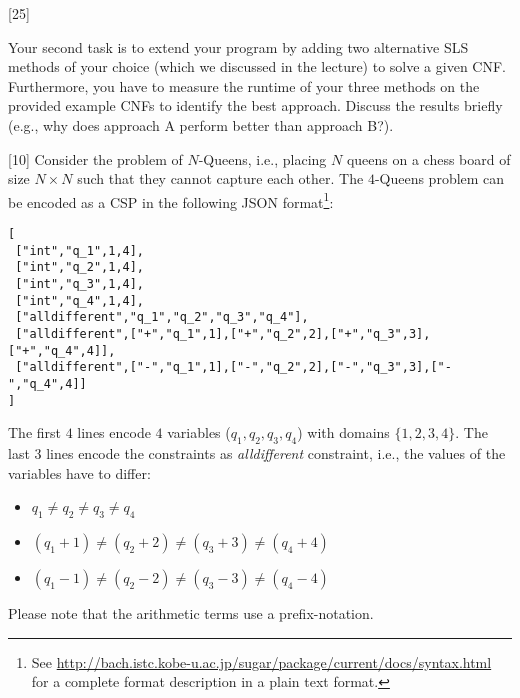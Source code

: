 \documentclass{exam}
\begin{document}
\begin{questions}
	[25]
	
	Your second task is to extend your program by adding two alternative SLS methods of your choice (which we discussed in the lecture) to solve a given CNF. Furthermore, you have to measure the runtime of your three methods on the provided example CNFs to identify the best approach. Discuss the results briefly (e.g., why does approach A perform better than approach B?).	

	[10]
		Consider the problem of $N$-Queens, i.e., placing $N$ queens on a chess board of size $N \times N$ such that they cannot capture each other.
		The $4$-Queens problem can be encoded as a CSP in the following JSON format\footnote{See \url{http://bach.istc.kobe-u.ac.jp/sugar/package/current/docs/syntax.html} for a complete format description in a plain text format.}:
		
		\begin{verbatim}
[
 ["int","q_1",1,4],
 ["int","q_2",1,4],
 ["int","q_3",1,4],
 ["int","q_4",1,4],
 ["alldifferent","q_1","q_2","q_3","q_4"],
 ["alldifferent",["+","q_1",1],["+","q_2",2],["+","q_3",3],["+","q_4",4]],
 ["alldifferent",["-","q_1",1],["-","q_2",2],["-","q_3",3],["-","q_4",4]]
]
		\end{verbatim}

		The first $4$ lines encode $4$ variables ($q_1, q_2, q_3, q_4$) with domains $\{1,2,3,4\}$.
		The last $3$ lines encode the constraints as \emph{alldifferent} constraint, i.e., the values of the variables have to differ:
		\begin{itemize}
		  \item $q_1 \neq q_2 \neq q_3 \neq q_4$
		  \item $(q_1 + 1)  \neq (q_2 + 2) \neq (q_3 + 3) \neq (q_4 + 4)$
		  \item $(q_1 - 1)  \neq (q_2 - 2) \neq (q_3 - 3) \neq (q_4 - 4)$
		\end{itemize}
		Please note that the arithmetic terms use a prefix-notation.
		

\end{questions}
\end{document}
